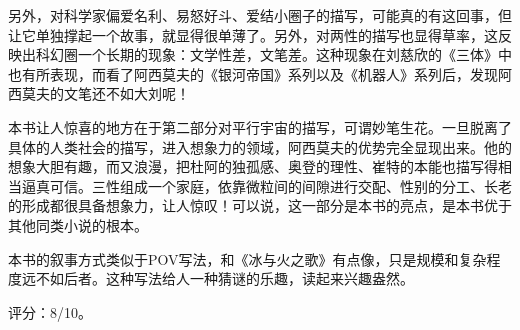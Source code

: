 另外，对科学家偏爱名利、易怒好斗、爱结小圈子的描写，可能真的有这回事，但让它单独撑起一个故事，就显得很单薄了。另外，对两性的描写也显得草率，这反映出科幻圈一个长期的现象：文学性差，文笔差。这种现象在刘慈欣的《三体》中也有所表现，而看了阿西莫夫的《银河帝国》系列以及《机器人》系列后，发现阿西莫夫的文笔还不如大刘呢！

本书让人惊喜的地方在于第二部分对平行宇宙的描写，可谓妙笔生花。一旦脱离了具体的人类社会的描写，进入想象力的领域，阿西莫夫的优势完全显现出来。他的想象大胆有趣，而又浪漫，把杜阿的独孤感、奥登的理性、崔特的本能也描写得相当逼真可信。三性组成一个家庭，依靠微粒间的间隙进行交配、性别的分工、长老的形成都很具备想象力，让人惊叹！可以说，这一部分是本书的亮点，是本书优于其他同类小说的根本。

本书的叙事方式类似于POV写法，和《冰与火之歌》有点像，只是规模和复杂程度远不如后者。这种写法给人一种猜谜的乐趣，读起来兴趣盎然。

评分：8/10。